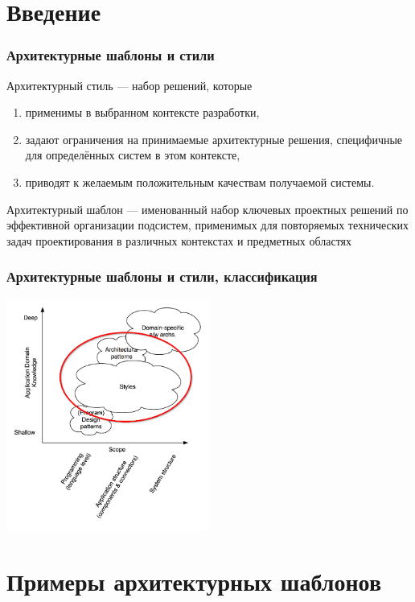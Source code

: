 \documentclass{../cscslides}
\begin{document}
    
    \frame{\titlepage}

    \section{Введение}

    \begin{frame}
        \frametitle{Архитектурные шаблоны и стили}
        Архитектурный стиль --- набор решений, которые
        \begin{enumerate}
            \item применимы в выбранном контексте разработки,
            \item задают ограничения на принимаемые архитектурные решения, специфичные для определённых систем в этом контексте,
            \item приводят к желаемым положительным качествам получаемой системы.
        \end{enumerate}
        Архитектурный шаблон --- именованный набор ключевых проектных решений по эффективной организации подсистем, применимых для повторяемых технических задач проектирования в различных контекстах и предметных областях
    \end{frame}

    \begin{frame}
        \frametitle{Архитектурные шаблоны и стили, классификация}
        \begin{center}
            \includegraphics[width=0.5\textwidth]{architecturalStylesHighlighted.png}
        \end{center}
    \end{frame}

    \section{Примеры архитектурных шаблонов}
\end{document}
